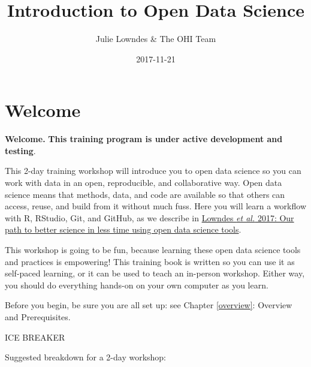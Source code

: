 \documentclass[]{book}
\title{Introduction to Open Data Science}
\author{Julie Lowndes \& The OHI Team}
\date{2017-11-21}
\theoremstyle{definition}
\theoremstyle{definition}
\theoremstyle{definition}
\theoremstyle{remark}
\begin{document}
\maketitle

{
\setcounter{tocdepth}{1}
\tableofcontents
}
\chapter{Welcome}\label{welcome}

\textbf{Welcome.} \textbf{This training program is under active
development and testing}.

This 2-day training workshop will introduce you to open data science so
you can work with data in an open, reproducible, and collaborative way.
Open data science means that methods, data, and code are available so
that others can access, reuse, and build from it without much fuss. Here
you will learn a workflow with R, RStudio, Git, and GitHub, as we
describe in
\href{https://www.nature.com/articles/s41559-017-0160}{Lowndes \emph{et
al.} 2017: Our path to better science in less time using open data
science tools}.

This workshop is going to be fun, because learning these open data
science tools and practices is empowering! This training book is written
so you can use it as self-paced learning, or it can be used to teach an
in-person workshop. Either way, you should do everything hands-on on
your own computer as you learn.

Before you begin, be sure you are all set up: see Chapter
\ref{overview}: Overview and Prerequisites.

ICE BREAKER

Suggested breakdown for a 2-day workshop:
\end{document}
